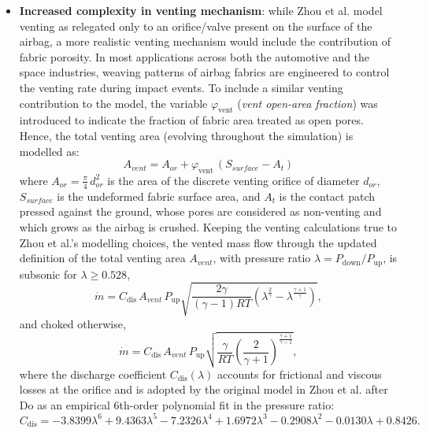 \begin{itemize}
  \item \textbf{Increased complexity in venting mechanism}: while Zhou et al. model venting as relegated only to an orifice/valve present on the surface of the airbag, a more realistic venting mechanism would include the contribution of fabric porosity. In most applications across both the automotive and the space industries, weaving patterns of airbag fabrics are engineered to control the venting rate during impact events. To include a similar venting contribution to the model, the variable $\varphi_\text{vent}$ (\textit{vent open-area fraction}) was introduced to indicate the fraction of fabric area treated as open pores. Hence, the total venting area (evolving throughout the simulation) is modelled as:
  \begin{equation}\label{eq:vent_area}
  A_{vent} = A_{or} + \varphi_\text{vent}\,(S_{surface} - A_t)
  \end{equation}
  where $A_{or} = \frac{\pi}{4}\,d_{or}^2$ is the area of the discrete venting orifice of diameter $d_{or}$, $S_{surface}$ is the undeformed fabric surface area, and $A_t$ is the contact patch pressed against the ground, whose pores are considered as non-venting and which grows as the airbag is crushed. Keeping the venting calculations true to Zhou et al.'s modelling choices, the vented mass flow through the updated definition of the total venting area $A_{vent}$, with pressure ratio $\lambda = P_\text{down}/P_\text{up}$, is subsonic for $\lambda \ge 0.528$,
  \begin{equation}\label{eq:orifice_subsonic}
    \dot m = C_\text{dis}\,A_{vent}\,P_\text{up}\sqrt{\frac{2\gamma}{(\gamma-1)RT}\left(\lambda^{\frac{2}{\gamma}} - \lambda^{\frac{\gamma+1}{\gamma}}\right)},
  \end{equation}
  and choked otherwise,
  \begin{equation}\label{eq:orifice_choked}
    \dot m = C_\text{dis}\,A_{vent}\,P_\text{up}\sqrt{\frac{\gamma}{RT}\left(\frac{2}{\gamma+1}\right)^{\frac{\gamma+1}{\gamma-1}}},
  \end{equation}
  where the discharge coefficient $C_\text{dis}(\lambda)$ accounts for frictional and viscous losses at the orifice and is adopted by the original model in Zhou et al. after Do \cite{Do2011} as an empirical 6th-order polynomial fit in the pressure ratio:
  \begin{equation}\label{eq:Cdis}
    C_\text{dis} = -3.8399\lambda^6 + 9.4363\lambda^5 - 7.2326\lambda^4 + 1.6972\lambda^3 - 0.2908\lambda^2 - 0.0130\lambda + 0.8426 .
  \end{equation}



\end{itemize}
